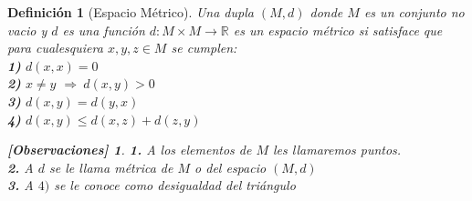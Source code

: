 \documentclass[oneside]{book} %
\theoremstyle{Teorema}
\newtheorem{Definicion}{Definición}[chapter]
\theoremstyle{Ejemplos}
\theoremstyle{[Obs]}
\newtheorem*{Obs}{[Observaciones]}
\renewcommand{\{}{\left\lbrace} %
\renewcommand{\}}{\right\rbrace} %
\newcommand{\R}{\mathbb{R}} %
\newcommand{\Imp}{$\Rightarrow\ $} %
\begin{document}
			\begin{Definicion}[Espacio Métrico]

				Una dupla $(M, d)$ donde $M$ es un conjunto no vacio y $d$ es una función $d : M \times M \to \R$ es un espacio métrico si satisface que para cualesquiera $x, y, z \in M$ se cumplen: \\

				\textbf{1)} $d(x, x) = 0$ \\

				\textbf{2)} $x \neq y$ \Imp $d(x, y) > 0$ \\

				\textbf{3)} $d(x, y) = d(y, x)$ \\

				\textbf{4)} $d(x, y) \leq d(x, z) + d(z, y)$ \\

				\begin{Obs}
				
					\hfill
				
					\textbf{1.} A los elementos de $M$ les llamaremos puntos. \\

					\textbf{2.} A $d$ se le llama métrica de $M$ o del espacio $(M, d)$ \\

					\textbf{3.} A \textbf{$4)$} se le conoce como desigualdad del triángulo
				
				\end{Obs}

			\end{Definicion}
\end{document}
